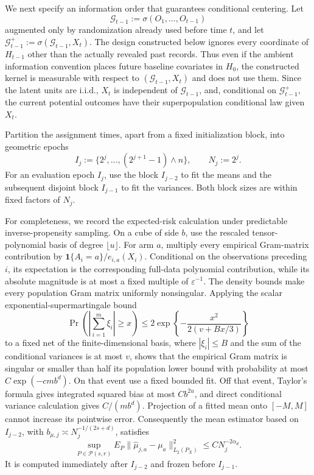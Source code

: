 We next specify an information order that guarantees conditional centering.  Let
\[
\mathcal G_{t-1}:=\sigma(O_1,\ldots,O_{t-1})
\]
augmented only by randomization already used before time \(t\), and let
\(\mathcal G_{t-1}^{+}:=\sigma(\mathcal G_{t-1},X_t)\).  The design constructed below ignores every coordinate of \(H_{t-1}\) other than the actually revealed past records.  Thus even if the ambient information convention places future baseline covariates in \(H_0\), the constructed kernel is measurable with respect to \((\mathcal G_{t-1},X_t)\) and does not use them.  Since the latent units are i.i.d., \(X_t\) is independent of \(\mathcal G_{t-1}\), and, conditional on \(\mathcal G_{t-1}^{+}\), the current potential outcomes have their superpopulation conditional law given \(X_t\).

Partition the assignment times, apart from a fixed initialization block, into geometric epochs
\[
I_j:=\{2^j,\ldots,(2^{j+1}-1)\wedge n\},
\qquad N_j:=2^j.
\tag{5}
\]
For an evaluation epoch \(I_j\), use the block \(I_{j-2}\) to fit the means and the subsequent disjoint block \(I_{j-1}\) to fit the variances.  Both block sizes are within fixed factors of \(N_j\).

For completeness, we record the expected-risk calculation under predictable inverse-propensity sampling.  On a cube of side \(b\), use the rescaled tensor-polynomial basis of degree \(\lfloor u\rfloor\).  For arm \(a\), multiply every empirical Gram-matrix contribution by
\(\mathbf 1\{A_i=a\}/e_{i,a}(X_i)\).  Conditional on the observations preceding \(i\), its expectation is the corresponding full-data polynomial contribution, while its absolute magnitude is at most a fixed multiple of \(\varepsilon^{-1}\).  The density bounds make every population Gram matrix uniformly nonsingular.  Applying the scalar exponential-supermartingale bound
\[
\Pr\!\left(\left|\sum_{i=1}^m\xi_i\right|\geq x\right)
\leq 2\exp\!\left\{-\frac{x^2}{2(v+Bx/3)}\right\}
\tag{6}
\]
to a fixed net of the finite-dimensional basis, where \(|\xi_i|\leq B\) and the sum of the conditional variances is at most \(v\), shows that the empirical Gram matrix is singular or smaller than half its population lower bound with probability at most
\(C\exp(-cmb^d)\).  On that event use a fixed bounded fit.  Off that event, Taylor's formula gives integrated squared bias at most \(Cb^{2u}\), and direct conditional variance calculation gives \(C/(mb^d)\).  Projection of a fitted mean onto \([-M,M]\) cannot increase its pointwise error.  Consequently the mean estimator based on \(I_{j-2}\), with
\(b_{\mu,j}\asymp N_j^{-1/(2s+d)}\), satisfies
\[
\sup_{P\in\mathcal P(s,r)}
E_P\|\widehat\mu_{j,a}-\mu_a\|_{L_2(P_X)}^2
\leq C N_j^{-2\alpha_d}.
\tag{7}
\]
It is computed immediately after \(I_{j-2}\) and frozen before \(I_{j-1}\).

